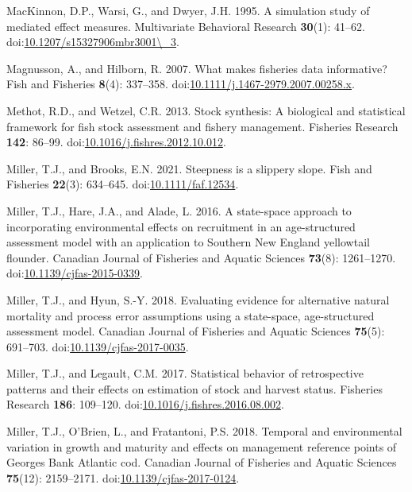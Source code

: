 \begin{CSLReferences}{1}{0}
MacKinnon, D.P., Warsi, G., and Dwyer, J.H. 1995. A simulation study of
mediated effect measures. Multivariate Behavioral Research
\textbf{30}(1): 41--62.
doi:\href{https://doi.org/10.1207/s15327906mbr3001/_3}{10.1207/s15327906mbr3001\textbackslash\_3}.

Magnusson, A., and Hilborn, R. 2007. What makes fisheries data
informative? Fish and Fisheries \textbf{8}(4): 337--358.
doi:\href{https://doi.org/10.1111/j.1467-2979.2007.00258.x}{10.1111/j.1467-2979.2007.00258.x}.

Methot, R.D., and Wetzel, C.R. 2013. Stock synthesis: A biological and
statistical framework for fish stock assessment and fishery management.
Fisheries Research \textbf{142}: 86--99.
doi:\href{https://doi.org/10.1016/j.fishres.2012.10.012}{10.1016/j.fishres.2012.10.012}.

Miller, T.J., and Brooks, E.N. 2021. Steepness is a slippery slope. Fish
and Fisheries \textbf{22}(3): 634--645.
doi:\href{https://doi.org/10.1111/faf.12534}{10.1111/faf.12534}.

Miller, T.J., Hare, J.A., and Alade, L. 2016. A state-space approach to
incorporating environmental effects on recruitment in an age-structured
assessment model with an application to {S}outhern {N}ew {E}ngland
yellowtail flounder. Canadian Journal of Fisheries and Aquatic Sciences
\textbf{73}(8): 1261--1270.
doi:\href{https://doi.org/10.1139/cjfas-2015-0339}{10.1139/cjfas-2015-0339}.

Miller, T.J., and Hyun, S.-Y. 2018. Evaluating evidence for alternative
natural mortality and process error assumptions using a state-space,
age-structured assessment model. Canadian Journal of Fisheries and
Aquatic Sciences \textbf{75}(5): 691--703.
doi:\href{https://doi.org/10.1139/cjfas-2017-0035}{10.1139/cjfas-2017-0035}.

Miller, T.J., and Legault, C.M. 2017. Statistical behavior of
retrospective patterns and their effects on estimation of stock and
harvest status. Fisheries Research \textbf{186}: 109--120.
doi:\href{https://doi.org/10.1016/j.fishres.2016.08.002}{10.1016/j.fishres.2016.08.002}.

Miller, T.J., O'Brien, L., and Fratantoni, P.S. 2018. Temporal and
environmental variation in growth and maturity and effects on management
reference points of {G}eorges {B}ank {A}tlantic cod. Canadian Journal of
Fisheries and Aquatic Sciences \textbf{75}(12): 2159--2171.
doi:\href{https://doi.org/10.1139/cjfas-2017-0124}{10.1139/cjfas-2017-0124}.


\end{CSLReferences}
